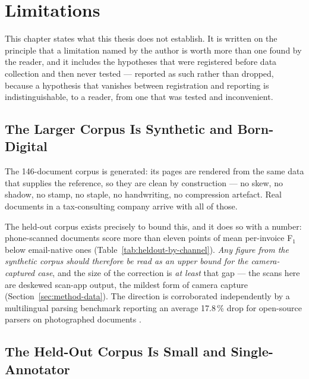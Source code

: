 \chapter{Limitations}
\label{ch:limitations}


This chapter states what this thesis does not establish. It is written on the principle that a
limitation named by the author is worth more than one found by the reader, and it includes the
hypotheses that were registered before data collection and then never tested --- reported as
such rather than dropped, because a hypothesis that vanishes between registration and reporting
is indistinguishable, to a reader, from one that was tested and inconvenient.

\section{The Larger Corpus Is Synthetic and Born-Digital}
\label{sec:lim-corpus}

The 146-document corpus is generated: its pages are rendered from the same data that supplies
the reference, so they are clean by construction --- no skew, no shadow, no stamp, no staple, no
handwriting, no compression artefact. Real documents in a tax-consulting company arrive with all of those.

The held-out corpus exists precisely to bound this, and it does so with a number:
phone-scanned documents score more than eleven points of mean per-invoice F$_1$ below
email-native ones (Table~\ref{tab:heldout-by-channel}). \emph{Any figure from the synthetic
corpus should therefore be read as an upper bound for the camera-captured case}, and the size of
the correction is \emph{at least} that gap --- the scans here are deskewed scan-app output, the
mildest form of camera capture (Section~\ref{sec:method-data}). The direction is corroborated
independently by a multilingual parsing benchmark reporting an average 17.8\,\% drop for
open-source parsers on photographed documents \parencite{mdpbench2026}.

\section{The Held-Out Corpus Is Small and Single-Annotator}
\label{sec:lim-heldout}


